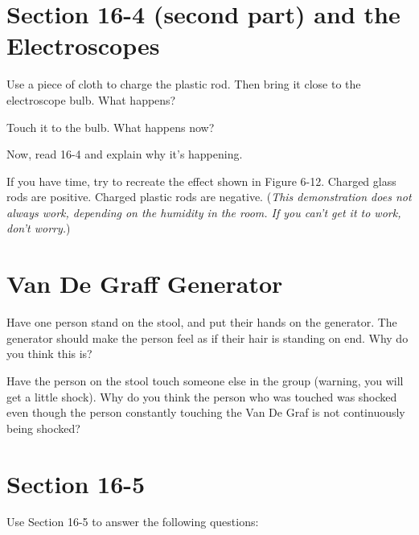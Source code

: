 \documentclass[10pt]{exam}
\begin{document}
\pagebreak

\section{Section 16-4 (second part) and the Electroscopes}

\begin{questions}
  \question
    Use a piece of cloth to charge the plastic rod.  Then bring it close to the electroscope bulb.  What happens? \vs

  \question
    Touch it to the bulb.  What happens now? \vs

  \question
    Now, read 16-4 and explain why it's happening. \vs

  \question
    If you have time, try to recreate the effect shown in Figure 6-12.  Charged glass rods are positive.  Charged plastic rods are negative. (\emph{This demonstration does not always work, depending on the humidity in the room.  If you can't get it to work, don't worry.})
    
\end{questions}

\section{Van De Graff Generator}

\begin{questions}
  \question
    Have one person stand on the stool, and put their hands on the generator.  The generator should make the person feel as if their hair is standing on end.  Why do you think this is? \vs

  \question
    Have the person on the stool touch someone else in the group (warning, you will get a little shock).  Why do you think the person who was touched was shocked even though the person constantly touching the Van De Graf is not continuously being shocked? \vs

\end{questions}

\pagebreak

\section{Section 16-5}

Use Section 16-5 to answer the following questions:
\end{document}
